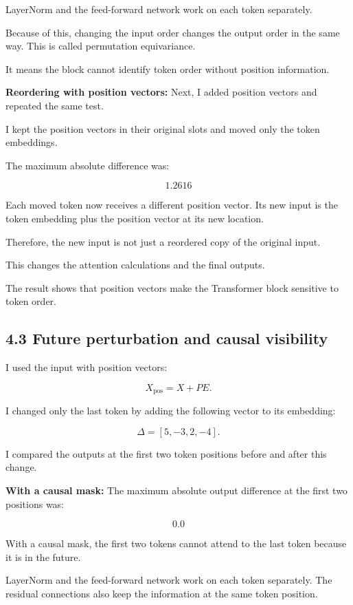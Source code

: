 \documentclass[11pt]{article}
\begin{document}
LayerNorm and the feed-forward network work
on each token separately.

Because of this, changing the input order
changes the output order in the same way.
This is called permutation equivariance.

It means the block cannot identify token order
without position information.

\textbf{Reordering with position vectors:} Next, I added position vectors and repeated
the same test.

I kept the position vectors in their original
slots and moved only the token embeddings.

The maximum absolute difference was:

\[
\boxed{1.2616}
\]

Each moved token now receives a different
position vector. Its new input is the token
embedding plus the position vector at its
new location.

Therefore, the new input is not just a
reordered copy of the original input.

This changes the attention calculations and
the final outputs.

The result shows that position vectors make
the Transformer block sensitive to token order.
\subsection*{4.3 Future perturbation and causal visibility}
I used the input with position vectors:

\[
X_{\mathrm{pos}}=X+PE.
\]

I changed only the last token by adding
the following vector to its embedding:

\[
\Delta=[5,-3,2,-4].
\]

I compared the outputs at the first two
token positions before and after this change.

\textbf{With a causal mask:} The maximum absolute output difference
at the first two positions was:

\[
\boxed{0.0}
\]

With a causal mask, the first two tokens
cannot attend to the last token because
it is in the future.

LayerNorm and the feed-forward network
work on each token separately.
The residual connections also keep
the information at the same token position.
\end{document}
